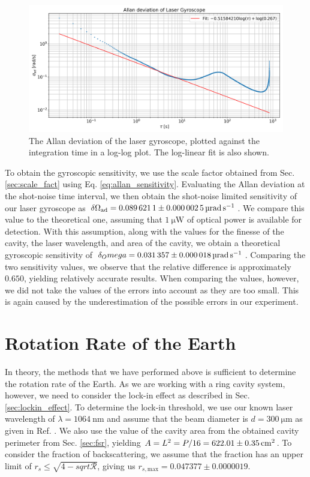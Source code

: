 \documentclass[a4paper]{report}
\numberwithin{equation}{section}
\begin{document}
\begin{figure}[h!]
	\centering
	\includegraphics[width=0.8\columnwidth]{allan.png}
	\caption{The Allan deviation of the laser gyroscope, plotted against the integration time in a log-log plot. The log-linear fit
	is also shown.}
	\label{fig:allan}
\end{figure}

To obtain the gyroscopic sensitivity, we use the scale factor obtained from Sec. \ref{sec:scale_fact} using Eq. \ref{eq:allan_sensitivity}.
Evaluating the Allan deviation at the shot-noise time interval, we then obtain the shot-noise limited sensitivity of our laser gyroscope as 
$\delta\Omega_{\mathrm{ad}} = \SI[]{0.0896211 \pm 0.0000025}[]{\micro\radian\per\second}$. We compare this value to the theoretical one,
assuming that $\SI[]{1}[]{\micro\watt}$ of optical power is available for detection. With this assumption, along with the 
values for the finesse of the cavity, the laser wavelength, and area of the cavity, we obtain a theoretical gyroscopic sensitivity
of $\delta_Omega = \SI{0.031357 \pm 0.000018}{\micro\radian\per\second}$. Comparing the two sensitivity values, we observe that the relative
difference is approximately $0.650$, yielding relatively accurate results. When comparing the values, however, we did not take the values 
of the errors into account as they are too small. This is again caused by the underestimation of the possible errors in our experiment. \par 

\section{Rotation Rate of the Earth}

In theory, the methods that we have performed above is sufficient to determine the rotation rate of the Earth. As we are 
working with a ring cavity system, however, we need to consider the lock-in effect as described in Sec. \ref{sec:lockin_effect}. 
To determine the lock-in threshold, we use our known laser wavelength of $\lambda = \SI{1064}{\nano\metre}$ and assume that the
 beam diameter is $d = \SI{300}{\micro\metre}$ as given in Ref. \cite{Groh2021}.
We also use the value of the cavity area from the obtained cavity perimeter from Sec. \ref{sec:fsr}, yielding
$A = L^2 = P / 16 = \SI{622.01 \pm 0.35}{\centi\meter\squared}$. To consider the fraction of backscattering, we assume that the 
fraction has an upper limit of $r_s \leq \sqrt{4 - sqrt{\mathcal{R}}}$, giving us $r_{s, \mathrm{max}} = 0.047377 \pm 0.0000019$. \par 
\end{document}

